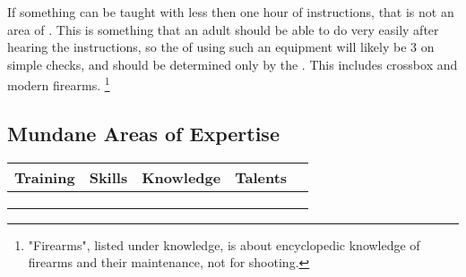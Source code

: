 If something can be taught with less then one hour of instructions, that is not an area of .
This is something that an adult should be able to do very easily after hearing the instructions,
so the  of using such an equipment will likely be 3 on simple checks,
and should be determined only by the .
This includes crossbox and modern firearms.
\footnote{"Firearms", listed under knowledge, is about encyclopedic knowledge of firearms and their maintenance, not for shooting.}









\pagebreak
\subsection{Mundane Areas of Expertise}

\begin{center}
	\scriptsize
	\begin{xltabular}{\textwidth}{XXXXl}
		Training				&	Skills					& Knowledge					&  Talents 				& \\
		\hline
		\listUniversalTraining	&	\listUniversalSkills	&	\listUniversalKnowledge	& \listUniversalTalents &  \\
		\listModernTraining		&	\listModernSkills		&	\listModernKnowledge	& \listModernTalents	&  \\
		\listMedievalTraining	&	\listMedievalSkills		&	\listMedievalKnowledge	&   					&  \\
	\end{xltabular}
\end{center}

